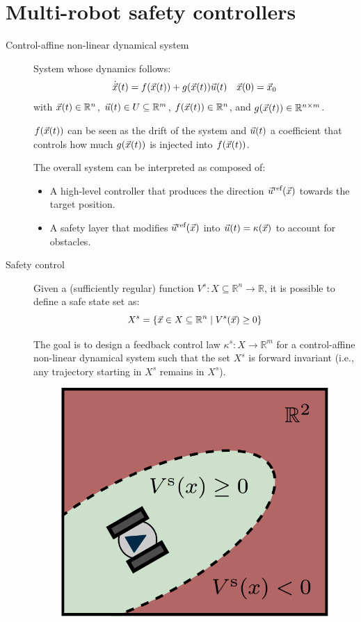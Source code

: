 \chapter{Multi-robot safety controllers}


\begin{description}
    \item[Control-affine non-linear dynamical system] 
        System whose dynamics follows:
        \[
            \dot{{\vec{x}}}(t) = f({\vec{x}}(t)) + g({\vec{x}}(t)) {\vec{u}}(t) \quad {\vec{x}}(0) = {\vec{x}}_0
        \]
        with ${\vec{x}}(t) \in \mathbb{R}^n$, ${\vec{u}}(t) \in U \subseteq \mathbb{R}^m$, $f({\vec{x}}(t)) \in \mathbb{R}^n$, and $g({\vec{x}}(t)) \in \mathbb{R}^{n \times m}$.

        $f({\vec{x}}(t))$ can be seen as the drift of the system and ${\vec{u}}(t)$ a coefficient that controls how much $g({\vec{x}}(t))$ is injected into $f({\vec{x}}(t))$.

        The overall system can be interpreted as composed of:
        \begin{itemize}
            \item A high-level controller that produces the direction ${\vec{u}}^\text{ref}({\vec{x}})$ towards the target position.
            \item A safety layer that modifies ${\vec{u}}^\text{ref}({\vec{x}})$ into ${\vec{u}}(t) = \kappa({\vec{x}})$ to account for obstacles.
        \end{itemize}

    \item[Safety control] 
        Given a (sufficiently regular) function $V^s: X \subseteq \mathbb{R}^n \rightarrow \mathbb{R}$, it is possible to define a safe state set as:
        \[
            X^s = \{ {\vec{x}} \in X \subseteq \mathbb{R}^n \mid V^s({\vec{x}}) \geq 0 \}
        \]

        The goal is to design a feedback control law $\kappa^s: X \rightarrow \mathbb{R}^m$ for a control-affine non-linear dynamical system such that the set $X^s$ is forward invariant (i.e., any trajectory starting in $X^s$ remains in $X^s$).

        \begin{figure}[H]
            \centering
            \includegraphics[width=0.25\linewidth]{./img/safety_control.png}
        \end{figure}


\end{description}

